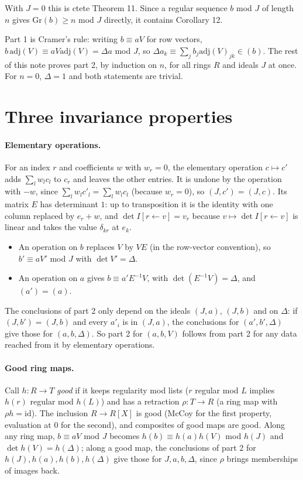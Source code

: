\documentclass[11pt]{amsart}
\theoremstyle{remark}
\newcommand{\Gr}{\mathrm{Gr}}
\newcommand{\adj}{\mathrm{adj}}
\begin{document}
With $J=0$ this is ctete Theorem 11.  Since a regular sequence $b$
mod $J$ of length $n$ gives $\Gr(b)\geq n$ mod $J$ directly, it contains
Corollary 12.

Part 1 is Cramer's rule: writing $b\equiv aV$ for row vectors,
$b\,\adj(V)\equiv aV\adj(V)=\Delta a$ mod $J$, so
$\Delta a_k\equiv\sum_j b_j\adj(V)_{jk}\in(b)$.  The rest of this note
proves part 2, by induction on $n$, for all rings $R$ and ideals $J$ at
once.  For $n=0$, $\Delta=1$ and both statements are trivial.

\section{Three invariance properties}

\paragraph{Elementary operations.}  For an index $r$ and coefficients
$w$ with $w_r=0$, the elementary operation $c\mapsto c'$ adds
$\sum_lw_lc_l$ to $c_r$ and leaves the other entries.  It is undone by
the operation with $-w$, since $\sum_l w_lc'_l=\sum_lw_lc_l$ (because
$w_r=0$), so $(J,c')=(J,c)$.  Its matrix $E$ has determinant $1$: up to
transposition it is the identity with one column replaced by
$e_r+w$, and $\det I[r\leftarrow v]=v_r$ because
$v\mapsto\det I[r\leftarrow v]$ is linear and takes the value
$\delta_{kr}$ at $e_k$.
\begin{itemize}
\item An operation on $b$ replaces $V$ by $VE$ (in the row-vector
  convention), so $b'\equiv aV'$ mod $J$ with $\det V'=\Delta$.
\item An operation on $a$ gives $b\equiv a'E^{-1}V$, with
  $\det(E^{-1}V)=\Delta$, and $(a')=(a)$.
\end{itemize}
The conclusions of part 2 only depend on the ideals $(J,a)$, $(J,b)$ and
on $\Delta$: if $(J,b')=(J,b)$ and every $a'_i$ is in $(J,a)$, the
conclusions for $(a',b',\Delta)$ give those for $(a,b,\Delta)$.  So part 2
for $(a,b,V)$ follows from part 2 for any data reached from it by
elementary operations.

\paragraph{Good ring maps.}  Call $h:R\to T$ \emph{good} if it keeps
regularity mod lists ($r$ regular mod $L$ implies $h(r)$ regular mod
$h(L)$) and has a retraction $\rho:T\to R$ (a ring map with
$\rho h=\mathrm{id}$).  The inclusion $R\to R[X]$ is good (McCoy for the
first property, evaluation at $0$ for the second), and composites of
good maps are good.  Along any ring map, $b\equiv aV$ mod $J$ becomes
$h(b)\equiv h(a)h(V)$ mod $h(J)$ and $\det h(V)=h(\Delta)$; along a good
map, the conclusions of part 2 for $h(J),h(a),h(b),h(\Delta)$ give those
for $J,a,b,\Delta$, since $\rho$ brings memberships of images back.
\end{document}
